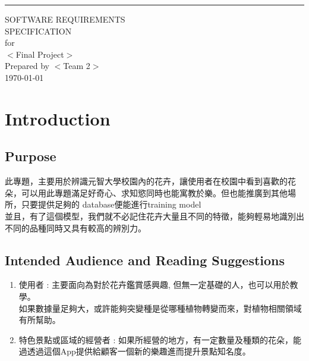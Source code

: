 \documentclass{scrreprt}
\date{}
\begin{document}
\begin{flushright}
    \rule{16cm}{5pt}\vskip1cm
    \begin{bfseries}
        \Huge{SOFTWARE REQUIREMENTS\\ SPECIFICATION}\\
        \vspace{1.9cm}
        for\\
        \vspace{1.9cm}
        $<$Final Project$>$\\
        \vspace{1.9cm}
        Prepared by $<$Team 2$>$\\
        \vspace{1.9cm}
        \today\\
    \end{bfseries}
\end{flushright}

\tableofcontents


\chapter{Introduction}

\section{Purpose}
\begin{CJK}{UTF8}{bkai}
	此專題，主要用於辨識元智大學校園內的花卉，讓使用者在校園中看到喜歡的花朵，可以用此專題滿足好奇心、求知慾同時也能寓教於樂。但也能推廣到其他場所，只要提供足夠的 database便能進行training model \\[6pt]
	並且，有了這個模型，我們就不必記住花卉大量且不同的特徵，能夠輕易地識別出不同的品種同時又具有較高的辨別力。
\end{CJK}

\section{Intended Audience and Reading Suggestions}

\begin{CJK}{UTF8}{bkai}
	
\end{CJK}
\begin{enumerate}
\item
\begin{CJK}{UTF8}{bkai}
	使用者 : 主要面向為對於花卉鑑賞感興趣, 但無一定基礎的人，也可以用於教學。\\
如果數據量足夠大，或許能夠突變種是從哪種植物轉變而來，對植物相關領域有所幫助。
\end{CJK}
\item
\begin{CJK}{UTF8}{bkai}
	特色景點或區域的經營者 : 如果所經營的地方，有一定數量及種類的花朵，能過透過這個App提供給顧客一個新的樂趣進而提升景點知名度。
\end{CJK}

\end{enumerate}
\end{document}
